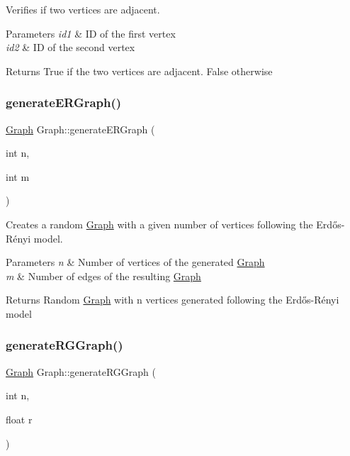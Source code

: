Verifies if two vertices are adjacent. 


\begin{DoxyParams}{Parameters}
{\em id1} & ID of the first vertex \\
\hline
{\em id2} & ID of the second vertex \\
\hline
\end{DoxyParams}
\begin{DoxyReturn}{Returns}
True if the two vertices are adjacent. False otherwise 
\end{DoxyReturn}
\mbox{\label{classGraph_a09cc21800f82465a691a53bf9cd4c0e8}} 
\subsubsection{\texorpdfstring{generate\+E\+R\+Graph()}{generateERGraph()}}
{\footnotesize\ttfamily \hyperlink{classGraph}{Graph} Graph\+::generate\+E\+R\+Graph (\begin{DoxyParamCaption}\item[{int}]{n,  }\item[{int}]{m }\end{DoxyParamCaption})\hspace{0.3cm}{\ttfamily [static]}}



Creates a random \hyperlink{classGraph}{Graph} with a given number of vertices following the Erdős-\/\+Rényi model. 


\begin{DoxyParams}{Parameters}
{\em n} & Number of vertices of the generated \hyperlink{classGraph}{Graph} \\
\hline
{\em m} & Number of edges of the resulting \hyperlink{classGraph}{Graph} \\
\hline
\end{DoxyParams}
\begin{DoxyReturn}{Returns}
Random \hyperlink{classGraph}{Graph} with n vertices generated following the Erdős-\/\+Rényi model 
\end{DoxyReturn}
\mbox{\label{classGraph_a17572d393dd57dc5dae485f215f75aad}} 
\subsubsection{\texorpdfstring{generate\+R\+G\+Graph()}{generateRGGraph()}}
{\footnotesize\ttfamily \hyperlink{classGraph}{Graph} Graph\+::generate\+R\+G\+Graph (\begin{DoxyParamCaption}\item[{int}]{n,  }\item[{float}]{r }\end{DoxyParamCaption})\hspace{0.3cm}{\ttfamily [static]}}



